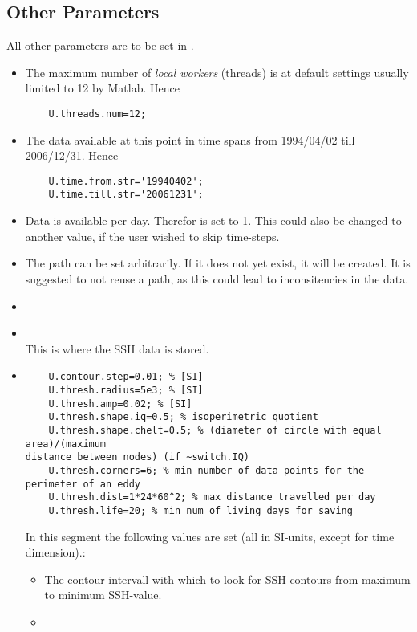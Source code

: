 \subsection{Other Parameters}
All other parameters are to be set in .
\begin{itemize}
	\item
	The maximum number of \textit{local workers} (threads) is at default settings
usually limited to 12 by Matlab. Hence
 \begin{lstlisting}
 	U.threads.num=12;
 \end{lstlisting}
 \item
 The data available at this point in time spans from 1994/04/02 till 2006/12/31.
Hence
 \begin{lstlisting}
 	U.time.from.str='19940402';
  	U.time.till.str='20061231';
 \end{lstlisting}
\item
Data is available per day. Therefor  is set
to 1. This could also be changed to another value, if the user wished to skip
time-steps.
	\item \label{codeEx:data}
	The path  can be set arbitrarily. If it
does not yet exist, it will be created. It is suggested to not reuse a path,
as this could lead to inconsitencies in the data.
\item
{}
\item
{}\\
This is where the SSH data is stored.
\item
\begin{lstlisting}
	U.contour.step=0.01; % [SI]
	U.thresh.radius=5e3; % [SI]
	U.thresh.amp=0.02; % [SI]
	U.thresh.shape.iq=0.5; % isoperimetric quotient
	U.thresh.shape.chelt=0.5; % (diameter of circle with equal area)/(maximum
distance between nodes) (if ~switch.IQ)
	U.thresh.corners=6; % min number of data points for the perimeter of an eddy
	U.thresh.dist=1*24*60^2; % max distance travelled per day
	U.thresh.life=20; % min num of living days for saving
\end{lstlisting}
In this segment the following values are set (all in SI-units, except for
time dimension).:
	\begin{itemize}
		\item
		The contour intervall with which to look for SSH-contours from maximum to
	minimum SSH-value.
	\item

\end{itemize}
\end{itemize}
